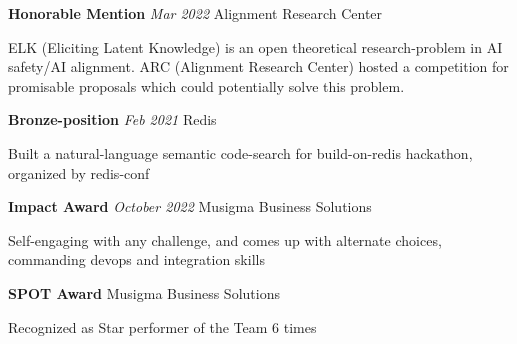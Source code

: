 \documentclass[fontsize=11pt]{article}
\newcommand{\sepspace}{\vspace*{1em}}   %
\newcommand{\EducationEntry}[4]{
    \noindent \textbf{#1} \hfill      %
    \colorbox{Black}{
      \parbox{8.5em}{
      \hfill\color{White}#2}} \par  %
    \noindent \textit{#3} \par        %
    \noindent\hangindent=2em\hangafter=0 \small #4 %
    \normalsize \par}
\newcommand{\AwardEntry}[4]{         %
    \noindent \textbf{#1} \noindent \textit{#3} \hfill {#2} \par
    \noindent \small #4 %
    \normalsize \par}
\begin{document}
\AwardEntry{Honorable Mention}{Alignment Research Center}
{Mar 2022}
{ELK (Eliciting Latent Knowledge) is an open theoretical research-problem in AI safety/AI alignment. ARC (Alignment Research Center) hosted a competition for promisable proposals which could potentially solve this problem.}
\sepspace
\AwardEntry{Bronze-position}{Redis}
{Feb 2021}
{Built a natural-language semantic code-search for build-on-redis hackathon, organized by redis-conf}
\sepspace
\AwardEntry{Impact Award}{Musigma Business Solutions}
{October 2022}
{Self-engaging with any challenge, and comes up with alternate choices, commanding devops and integration skills}
\sepspace
\AwardEntry{SPOT Award}{Musigma Business Solutions}
{}
{Recognized as \textquotedbl{}Star performer of the Team\textquotedbl{} 6 times}
\ 
\end{document}
